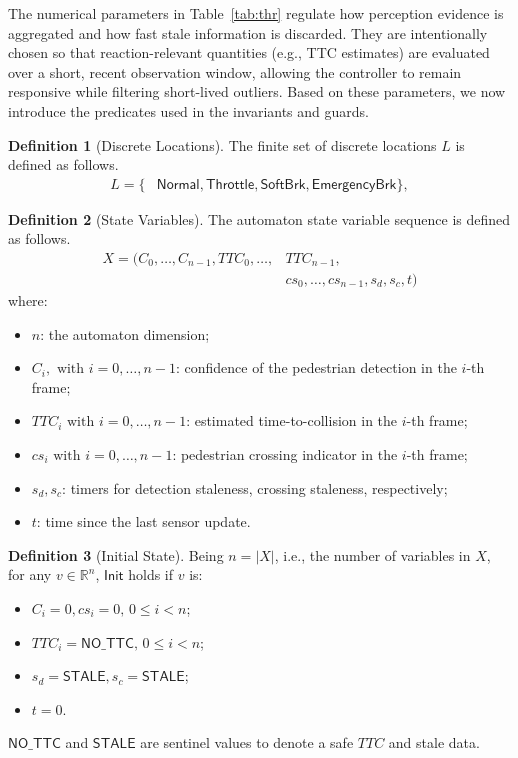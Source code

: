 \documentclass[journal]{IEEEtran}
\theoremstyle{definition}
\newtheorem{definition}{Definition}
\theoremstyle{property}
\newcommand{\thr}[1]{\mathsf{#1}}
\newcommand{\Normal}{\mathsf{Normal}}
\newcommand{\Warning}{\mathsf{Warning}}
\newcommand{\Throttle}{\mathsf{Throttle}}
\newcommand{\SoftBrake}{\mathsf{SoftBrk}}
\newcommand{\EmergencyBrake}{\mathsf{EmergencyBrk}}
\begin{document}
The numerical parameters in Table~\ref{tab:thr} regulate how perception evidence is aggregated and how fast stale information is discarded. They are intentionally chosen so that reaction-relevant quantities (e.g., TTC estimates) are evaluated over a short, recent observation window, allowing the controller to remain responsive while filtering short-lived outliers. Based on these parameters, we now introduce the predicates used in the invariants and guards.

\begin{definition}[Discrete Locations]
The finite set of discrete locations $L$ is defined as follows.
\[
\begin{aligned}
    L = \{&\Normal, 
    \Throttle, \SoftBrake, \EmergencyBrake\},
\end{aligned}
\]
\end{definition}


\begin{definition}[State Variables]\label{def:vars}
The automaton state variable sequence is defined as follows.
\[
\begin{aligned}
X = (C_0,\ldots, C_{n-1}, TTC_0,\ldots, &TTC_{n-1}, \\ 
&cs_0,\ldots, cs_{n-1}, s_d, s_c, t)
\end{aligned}
\]
where:
\begin{itemize}
    \item \(n\): the automaton dimension;
    \item \(C_i, \text{ with } i = 0,\ldots,n-1\): confidence of the pedestrian detection in the \(i\)-th frame;
    \item \(TTC_i \text{ with } i = 0,\ldots,n-1\): estimated time-to-collision in the \(i\)-th frame;
    \item \(cs_i \text{ with } i = 0,\ldots,n-1\): pedestrian crossing indicator in the \(i\)-th frame;
    \item \(s_d, s_c\): timers for detection staleness, crossing staleness, respectively;
    \item \(t\): time since the last sensor update.
\end{itemize}
\end{definition}


\begin{definition}[Initial State]\label{def:init}
Being $n = |X|$, i.e., the number of variables in $X$, for any $v \in \mathbb{R}^n$, $\thr{Init}$ holds if $v$ is:  
\begin{itemize}
    \item $C_i = 0, cs_i = 0, \, 0 \leq i < n$;
    \item $TTC_i = \thr{NO\_TTC},\,  0 \leq i < n$;
    \item $s_d = \thr{STALE}, s_c = \thr{STALE}$;
    \item $t = 0$.
\end{itemize}
$\thr{NO\_TTC}$ and $\thr{STALE}$ are sentinel values to denote a safe $TTC$ and stale data.
\end{definition}
\end{document}
